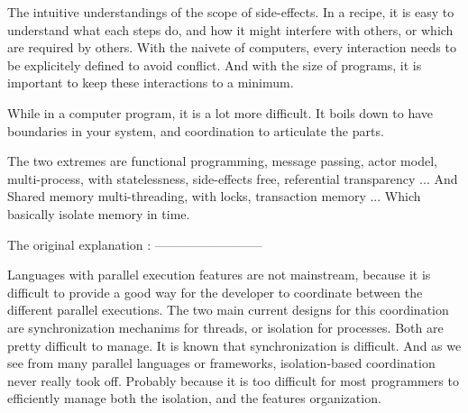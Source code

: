 The intuitive understandings of the scope of side-effects.
In a recipe, it is easy to understand what each steps do, and how it might interfere with others, or which are required by others.
With the naivete of computers, every interaction needs to be explicitely defined to avoid conflict.
And with the size of programs, it is important to keep these interactions to a minimum.

While in a computer program, it is a lot more difficult.
It boils down to have boundaries in your system, and coordination to articulate the parts.

The two extremes are functional programming, message passing, actor model, multi-process, with statelessness, side-effects free, referential transparency ...
And Shared memory multi-threading, with locks, transaction memory ...
Which basically isolate memory in time.





The original explanation :
--------------------------

Languages with parallel execution features are not mainstream, because it is difficult to provide a good way for the developer to coordinate between the different parallel executions.
The two main current designs for this coordination are synchronization mechanims for threads, or isolation for processes.
Both are pretty difficult to manage.
It is known that synchronization is difficult. 
And as we see from many parallel languages or frameworks, isolation-based coordination never really took off. Probably because it is too difficult for most programmers to efficiently manage both the isolation, and the features organization.

